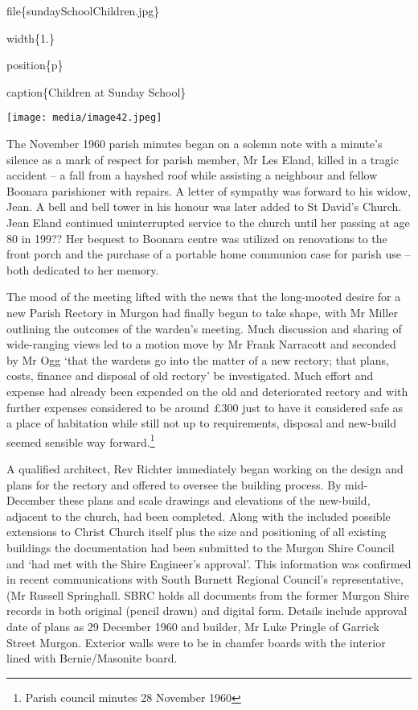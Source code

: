 file\{sundaySchoolChildren.jpg\}

width\{1.\}

position\{p\}

caption\{Children at Sunday School\}

\texttt{[image: media/image42.jpeg]}

The November 1960 parish minutes began on a solemn note with a minute's silence as a mark of respect for parish member, Mr Les Eland, killed in a tragic accident -- a fall from a hayshed roof while assisting a neighbour and fellow Boonara parishioner with repairs. A letter of sympathy was forward to his widow, Jean. A bell and bell tower in his honour was later added to St David's Church. Jean Eland continued uninterrupted service to the church until her passing at age 80 in 199?? Her bequest to Boonara centre was utilized on renovations to the front porch and the purchase of a portable home communion case for parish use -- both dedicated to her memory.

The mood of the meeting lifted with the news that the long-mooted desire for a new Parish Rectory in Murgon had finally begun to take shape, with Mr Miller outlining the outcomes of the warden's meeting. Much discussion and sharing of wide-ranging views led to a motion move by Mr Frank Narracott and seconded by Mr Ogg `that the wardens go into the matter of a new rectory; that plans, costs, finance and disposal of old rectory' be investigated. Much effort and expense had already been expended on the old and deteriorated rectory and with further expenses considered to be around £300 just to have it considered safe as a place of habitation while still not up to requirements, disposal and new-build seemed sensible way forward.\footnote{Parish council minutes 28 November 1960}

A qualified architect, Rev Richter immediately began working on the design and plans for the rectory and offered to oversee the building process. By mid-December these plans and scale drawings and elevations of the new-build, adjacent to the church, had been completed. Along with the included possible extensions to Christ Church itself plus the size and positioning of all existing buildings the documentation had been submitted to the Murgon Shire Council and `had met with the Shire Engineer's approval'. This information was confirmed in recent communications with South Burnett Regional Council's representative, (Mr Russell Springhall. SBRC holds all documents from the former Murgon Shire records in both original (pencil drawn) and digital form. Details include approval date of plans as 29 December 1960 and builder, Mr Luke Pringle of Garrick Street Murgon. Exterior walls were to be in chamfer boards with the interior lined with Bernie/Masonite board.

